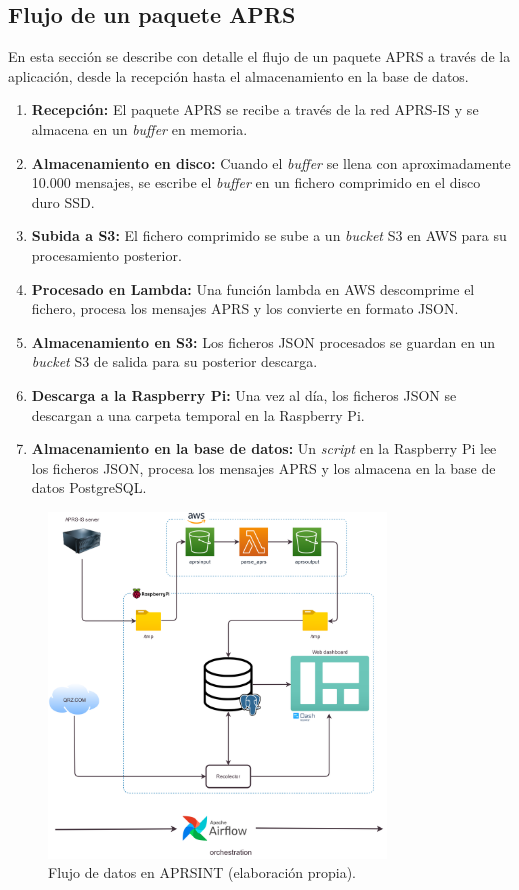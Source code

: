 \FloatBarrier

\subsection{Flujo de un paquete APRS}
En esta sección se describe con detalle el flujo de un paquete APRS a través de la aplicación, desde la recepción hasta el almacenamiento en la base de datos.
\begin{enumerate}
	\item \textbf{Recepción:} El paquete APRS se recibe a través de la red APRS-IS y se almacena en un \textit{buffer} en memoria.
	\item \textbf{Almacenamiento en disco:} Cuando el \textit{buffer} se llena con aproximadamente 10.000 mensajes, se escribe el \textit{buffer} en un fichero comprimido en el disco duro SSD.
	\item \textbf{Subida a S3:} El fichero comprimido se sube a un \textit{bucket} S3 en AWS para su procesamiento posterior.
	\item \textbf{Procesado en Lambda:} Una función lambda en AWS descomprime el fichero, procesa los mensajes APRS y los convierte en formato JSON.
	\item \textbf{Almacenamiento en S3:} Los ficheros JSON procesados se guardan en un \textit{bucket} S3 de salida para su posterior descarga.
	\item \textbf{Descarga a la Raspberry Pi:} Una vez al día, los ficheros JSON se descargan a una carpeta temporal en la Raspberry Pi.
	\item \textbf{Almacenamiento en la base de datos:} Un \textit{script} en la Raspberry Pi lee los ficheros JSON, procesa los mensajes APRS y los almacena en la base de datos PostgreSQL.
\end{enumerate}

\begin{figure}[h]
	\centering
	\includegraphics[width=0.8\textwidth]{Imagenes/Chapter_4/cloud_arch.png}
	\caption[Flujo de datos en APRSINT.]{Flujo de datos en APRSINT (elaboración propia).}
	\label{fig:aws-s3}
\end{figure}

